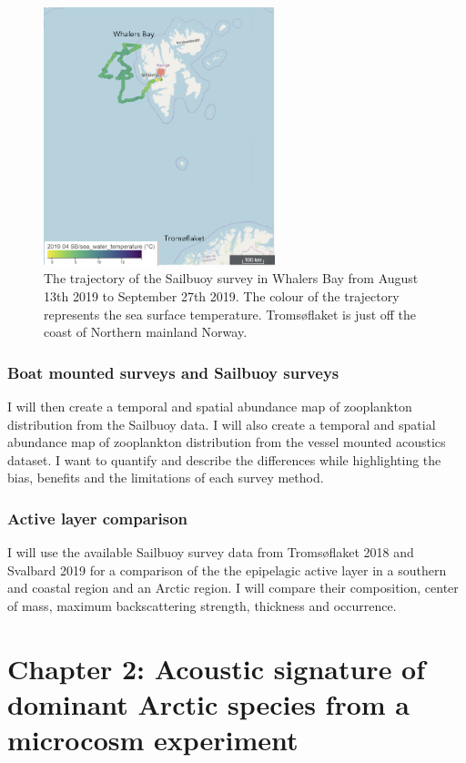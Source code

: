 \documentclass[a4paper, 12pt, Ariel]{article}
\begin{document}
\begin{figure}[H]
	\centering
	\includegraphics[width=0.6\textwidth]{SB2019WhalersBay.png}
	\caption{The trajectory of the Sailbuoy survey in Whalers Bay from August 13th 2019 to September 27th 2019. The colour of the trajectory represents the sea surface temperature. Tromsøflaket is just off the coast of Northern mainland Norway.}
	\label{fig:whalers}
\end{figure}
 
\subsubsection {Boat mounted surveys and Sailbuoy surveys}
I will then create a temporal and spatial abundance map of zooplankton distribution from the Sailbuoy data. I will also create a temporal and spatial abundance map of zooplankton distribution from the vessel mounted acoustics dataset. I want to quantify and describe the differences while highlighting the bias, benefits and the limitations of each survey method.

\subsubsection {Active layer comparison}
I will use the available Sailbuoy survey data from Tromsøflaket 2018 and Svalbard 2019 for a comparison of the the epipelagic active layer in a southern and coastal region and an Arctic region. I will compare their composition, center of mass, maximum backscattering strength, thickness and occurrence.





\section{Chapter 2: Acoustic signature of dominant Arctic species from a microcosm experiment}
\end{document}
